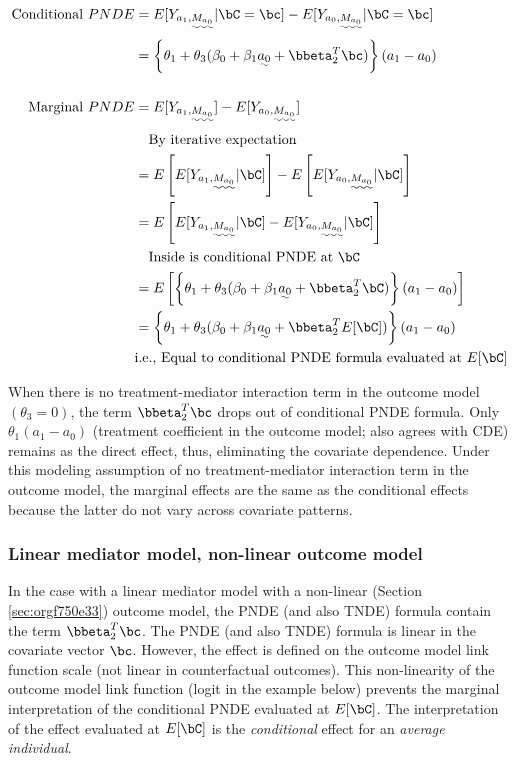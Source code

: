 \documentclass[10pt]{article}
\begin{document}
\begin{align*}
  \text{Conditional }PNDE
  &= E[Y_{a_{1},\uwave{M_{a_{0}}}} | \bC = \bc] - E[Y_{a_{0},\uwave{M_{a_{0}}}} | \bC = \bc]\\
  &= \left\{ \theta_{1} + \theta_{3}(\beta_{0} + \beta_{1}\uwave{a_{0}} + \bbeta_{2}^{T}\bc) \right\} (a_{1} - a_{0})\\
  \\
  \text{Marginal }PNDE
  &= E[Y_{a_{1},\uwave{M_{a_{0}}}}] - E[Y_{a_{0},\uwave{M_{a_{0}}}}]\\
  &~~~\text{By iterative expectation}\\
  &= E \left[ E[Y_{a_{1},\uwave{M_{a_{0}}}} | \bC] \right] -
     E \left[ E[Y_{a_{0},\uwave{M_{a_{0}}}} | \bC] \right]\\
  &= E \left[ E[Y_{a_{1},\uwave{M_{a_{0}}}} | \bC] - E[Y_{a_{0},\uwave{M_{a_{0}}}} | \bC] \right]\\
  &~~~\text{Inside is conditional PNDE at } \bC\\
  &= E\left[ \left\{ \theta_{1} + \theta_{3}(\beta_{0} + \beta_{1}\uwave{a_{0}} + \bbeta_{2}^{T}\bC) \right\} (a_{1} - a_{0}) \right]\\
  &= \left\{ \theta_{1} + \theta_{3}(\beta_{0} + \beta_{1}\uwave{a_{0}} + \bbeta_{2}^{T}E[\bC]) \right\} (a_{1} - a_{0})\\
  &\text{i.e., Equal to conditional PNDE formula evaluated at } E[\bC]\\
\end{align*}

When there is no treatment-mediator interaction term in the outcome model \((\theta_{3} = 0)\), the term \(\bbeta_{2}^{T}\bc\) drops out of conditional PNDE formula. Only \(\theta_{1}(a_{1} - a_{0})\) (treatment coefficient in the outcome model; also agrees with CDE) remains as the direct effect, thus, eliminating the covariate dependence. Under this modeling assumption of no treatment-mediator interaction term in the outcome model, the marginal effects are the same as the conditional effects because the latter do not vary across covariate patterns.

\subsubsection{Linear mediator model, non-linear outcome model}
\label{sec:orga4632cc}
In the case with a linear mediator model with a non-linear (Section \ref{sec:orgf750e33}) outcome model, the PNDE (and also TNDE) formula contain the term \(\bbeta_{2}^{T}\bc\). The PNDE (and also TNDE) formula is linear in the covariate vector \(\bc\). However, the effect is defined on the outcome model link function scale (not linear in counterfactual outcomes). This non-linearity of the outcome model link function (logit in the example below) prevents the marginal interpretation of the conditional PNDE evaluated at \(E[\bC]\). The interpretation of the effect evaluated at \(E[\bC]\) is the \emph{conditional} effect for an \emph{average individual}.
\end{document}

